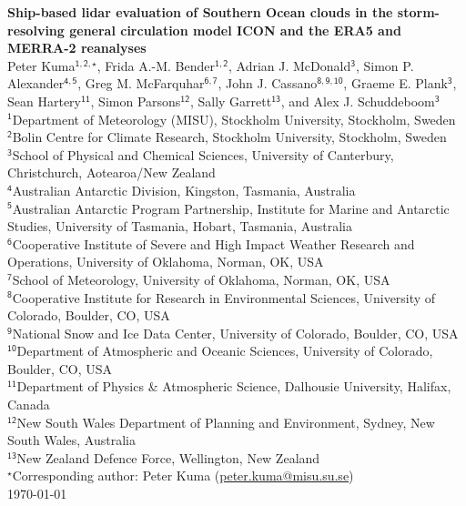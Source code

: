 \documentclass[12pt,a4paper]{article}
\begin{document}
\fontsize{13pt}{15pt}\selectfont

\begin{center} \Large \sffamily\textbf{Ship-based lidar evaluation of Southern Ocean clouds in the storm-resolving general circulation model ICON and the ERA5 and MERRA-2 reanalyses}\\[0.4cm]
\normalsize Peter Kuma$^\mathsf{1,2,\star}$, Frida A.-M. Bender$^\mathsf{1,2}$, Adrian J. McDonald$^\mathsf{3}$, Simon P. Alexander$^\mathsf{4,5}$, Greg M. McFarquhar$^\mathsf{6,7}$, John J. Cassano$^\mathsf{8,9,10}$, Graeme E. Plank$^\mathsf{3}$, Sean Hartery$^\mathsf{11}$, Simon Parsons$^\mathsf{12}$, Sally Garrett$^\mathsf{13}$, and Alex J. Schuddeboom$^\mathsf{3}$\\[0.4cm]
\footnotesize
$^\mathsf{1}$Department of Meteorology (MISU), Stockholm University, Stockholm, Sweden\\
$^\mathsf{2}$Bolin Centre for Climate Research, Stockholm University, Stockholm, Sweden\\
$^\mathsf{3}$School of Physical and Chemical Sciences, University of Canterbury, Christchurch, Aotearoa/New Zealand\\
$^\mathsf{4}$Australian Antarctic Division, Kingston, Tasmania, Australia\\
$^\mathsf{5}$Australian Antarctic Program Partnership, Institute for Marine and Antarctic Studies, University of Tasmania, Hobart, Tasmania, Australia\\
$^\mathsf{6}$Cooperative Institute of Severe and High Impact Weather Research and Operations, University of Oklahoma, Norman, OK, USA\\
$^\mathsf{7}$School of Meteorology, University of Oklahoma, Norman, OK, USA\\
$^\mathsf{8}$Cooperative Institute for Research in Environmental Sciences, University of Colorado, Boulder, CO, USA\\
$^\mathsf{9}$National Snow and Ice Data Center, University of Colorado, Boulder, CO, USA\\
$^\mathsf{10}$Department of Atmospheric and Oceanic Sciences, University of Colorado, Boulder, CO, USA\\[0.2cm]
$^\mathsf{11}$Department of Physics \& Atmospheric Science, Dalhousie University, Halifax, Canada\\
$^\mathsf{12}$New South Wales Department of Planning and Environment, Sydney, New South Wales, Australia\\
$^\mathsf{13}$New Zealand Defence Force, Wellington, New Zealand\\
$^\star$Corresponding author: Peter Kuma (\href{mailto:peter.kuma@misu.su.se}{peter.kuma@misu.su.se})\\[0.4cm]
\normalsize \today\\[0.4cm]

\end{center}
\end{document}
